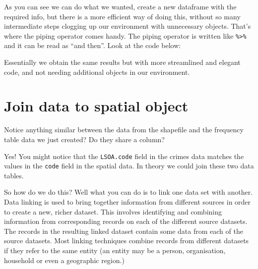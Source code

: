 \documentclass[]{book}
\newenvironment{Shaded}{\begin{snugshade}}{\end{snugshade}}
\newcommand{\CommentTok}[1]{\textcolor[rgb]{0.56,0.35,0.01}{\textit{#1}}}
\newcommand{\DataTypeTok}[1]{\textcolor[rgb]{0.13,0.29,0.53}{#1}}
\newcommand{\KeywordTok}[1]{\textcolor[rgb]{0.13,0.29,0.53}{\textbf{#1}}}
\newcommand{\NormalTok}[1]{#1}
\newcommand{\OperatorTok}[1]{\textcolor[rgb]{0.81,0.36,0.00}{\textbf{#1}}}
\newcommand{\StringTok}[1]{\textcolor[rgb]{0.31,0.60,0.02}{#1}}
\begin{document}
As you can see we can do what we wanted, create a new dataframe with the required info, but there is a more efficient way of doing this, without so many intermediate steps clogging up our environment with unnecessary objects. That's where the piping operator comes handy. The piping operator is written like \texttt{\%\textgreater{}\%} and it can be read as ``and then''. Look at the code below:

\begin{Shaded}
\end{Shaded}

Essentially we obtain the same results but with more streamlined and elegant code, and not needing additional objects in our environment.

\hypertarget{join-data-to-spatial-object}{%
\section{Join data to spatial object}\label{join-data-to-spatial-object}}

Notice anything similar between the data from the shapefile and the frequency table data we just created? Do they share a column?

Yes! You might notice that the \texttt{LSOA.code} field in the crimes data matches the values in the \texttt{code} field in the spatial data. In theory we could join these two data tables.

So how do we do this? Well what you can do is to link one data set with another. Data linking is used to bring together information from different sources in order to create a new, richer dataset. This involves identifying and combining information from corresponding records on each of the different source datasets. The records in the resulting linked dataset contain some data from each of the source datasets. Most linking techniques combine records from different datasets if they refer to the same entity (an entity may be a person, organisation, household or even a geographic region.)
\end{document}
